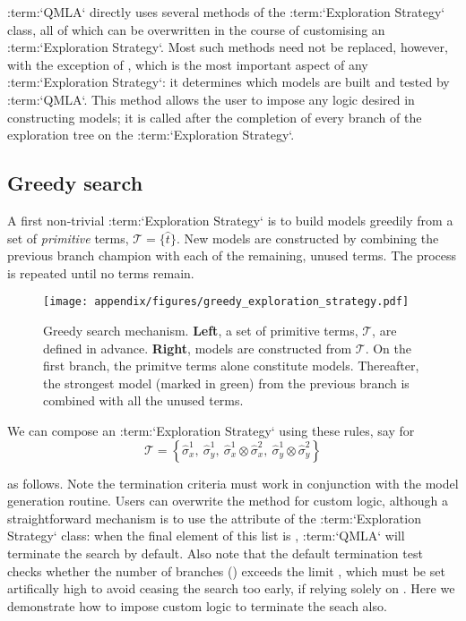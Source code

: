 \par 
:term:`QMLA` directly uses several methods of the :term:`Exploration Strategy` class, 
    all of which can be overwritten in the course of customising an :term:`Exploration Strategy`. 
Most such methods need not be replaced, however, with the exception of , 
    which is the most important aspect of any :term:`Exploration Strategy`: 
    it determines which models are built and tested by :term:`QMLA`. 
This method allows the user to impose any logic desired in constructing models;
    it is called after the completion of every branch of the  exploration tree on the :term:`Exploration Strategy`. 
\par 

\subsection{Greedy search}\label{sec:greedy_search}

A first non-trivial :term:`Exploration Strategy` is to build models greedily from a set of \emph{primitive} terms, $\mathcal{T} = \{ \hat{t} \} $. 
New models are constructed by combining the previous branch champion with each of the remaining, unused terms. 
The process is repeated until no terms remain. 

\begin{figure}[H]
    \begin{center}
        \texttt{[image: appendix/figures/greedy\_exploration\_strategy.pdf]}
    \end{center}
    \caption[Greedy search mechanism]{
        Greedy search mechanism.
        \textbf{Left}, a set of primitive terms, $\mathcal{T}$, are defined in advance. 
        \textbf{Right}, models are constructed from $\mathcal{T}$. 
        On the first branch, the primitve terms alone constitute models. 
        Thereafter, the strongest model (marked in green) from the previous branch is combined with all the unused terms. 
    }
    \label{fig:greedy_exploration_strategy}
\end{figure}

We can compose an :term:`Exploration Strategy` using these rules, say for 
\begin{equation*}
    \mathcal{T} = \left\{ \hat{\sigma}_x^1, \ \hat{\sigma}_y^1, \ \hat{\sigma}_x^1 \otimes \hat{\sigma}_x^2, \ \hat{\sigma}_y^1 \otimes \hat{\sigma}_y^2 \right\}
\end{equation*}

as follows.
Note the termination criteria must work in conjunction with the model generation routine. 
Users can overwrite the method  for custom logic, 
    although a straightforward mechanism is to use the  attribute of the :term:`Exploration Strategy` class: 
    when the final element of this list is , :term:`QMLA` will terminate the search by default. 
Also note that the default termination test checks whether the number of branches () exceeds the 
    limit , which must be set artifically high to avoid ceasing the search too early, 
    if relying solely on . 
Here we demonstrate how to impose custom logic to terminate the seach also. 

